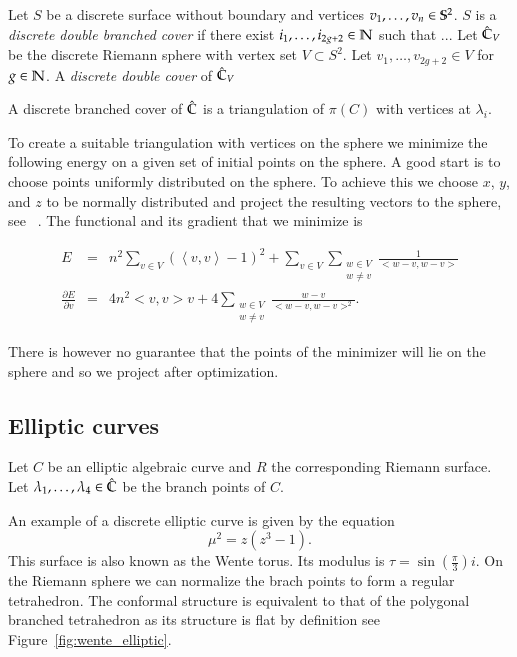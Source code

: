 \documentclass[Thesis.tex]{subfiles}
\begin{document}
\begin{definition}
Let $S$ be a discrete surface without boundary and vertices $v_1,\ldots,v_n\in\S^2$. $S$ is a \emph{discrete double branched cover} if there exist $i_1,\ldots, i_{2g+2}\in \N$ such that ... 
Let $\Chat_V$ be the discrete Riemann sphere with vertex set $V\subset S^2$. Let $v_1,
\ldots,v_{2g+2} \in V$ for $g\in \N$. A \emph{discrete double cover} of $\Chat_V$ 
\end{definition}

A discrete branched cover of $\Chat$ is a triangulation of $\pi(C)$ with vertices at $\lambda_i$.


To create a suitable triangulation with vertices on the sphere we minimize the following energy on a given set
of initial points on the sphere. A good start is to choose points uniformly distributed on the sphere. To achieve this we choose $x$, $y$, and $z$ to be normally distributed and project the resulting vectors to the sphere, see~ \cite{Muller1959}. The functional and its gradient that we minimize is

\begin{eqnarray*}
	E &=& n^2\sum_{v\in V}\left( \left<v,v\right> - 1\right)^2 + \sum_{v\in V}\sum_{\substack{w\in V\\w\neq v}} \frac{1}{<w-v, w-v>}\\
	\frac{\partial E}{\partial v} &=& 4n^2<v,v>v + 4\sum_{\substack{w\in V\\w\neq v}}\frac{w-v}{<w-v,w-v>^2}.
\end{eqnarray*}

There is however no guarantee that the points of the minimizer will lie on the sphere and so we project 
after optimization.


\subsection{Elliptic curves}
\label{sec:examples_elliptic}

Let $C$ be an elliptic algebraic curve and $R$ the corresponding Riemann surface. Let $\lambda_1, \ldots, \lambda_4 \in \Chat$ be the branch points of $C$. 

\begin{example}
\label{ex:wente_elliptic}
An example of a discrete elliptic curve is given by the equation
\begin{equation}
	\mu^2=z(z^3-1).
\end{equation}
This surface is also known as the Wente torus. Its modulus is $\tau=\sin(\frac{\pi}{3})i$. On the Riemann sphere
we can normalize the brach points to form a regular tetrahedron. The conformal structure is equivalent to that of 
the polygonal branched tetrahedron as its structure is flat by definition see Figure~\ref{fig:wente_elliptic}.
\end{example}
\end{document}

